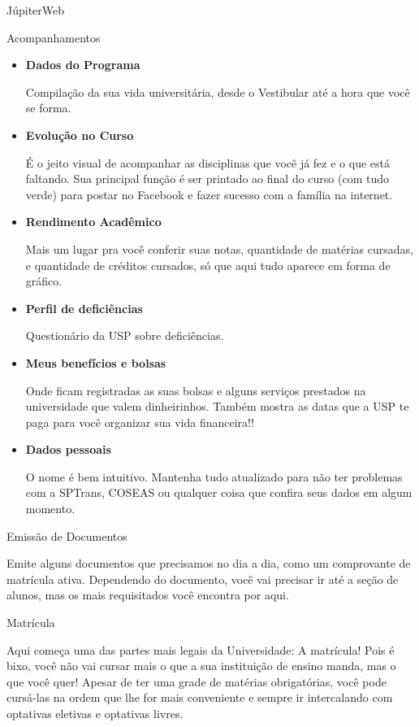 \begin{secao}{JúpiterWeb}
\begin{subsecao}{Acompanhamentos}
\begin{itemize}
  \item \textbf{Dados do Programa}

    Compilação da sua vida universitária, desde o Vestibular até a hora que
    você se forma.
  \item \textbf{Evolução no Curso}

    É o jeito visual de acompanhar as disciplinas que você já fez e o que está
    faltando. Sua principal função é ser printado ao final do curso (com tudo
    verde) para postar no Facebook e fazer sucesso com a família na internet.
  \item \textbf{Rendimento Acadêmico}

    Mais um lugar pra você conferir suas notas, quantidade de matérias
    cursadas, e quantidade de créditos cursados, só que aqui tudo aparece em
    forma de gráfico.
  \item \textbf{Perfil de deficiências}

    Questionário da USP sobre deficiências.

  \item \textbf{Meus benefícios e bolsas}

    Onde ficam registradas as suas bolsas e alguns serviços prestados na
    universidade que valem dinheirinhos. Também mostra as datas que a USP te
    paga para você organizar sua vida financeira!!

  \item \textbf{Dados pessoais}

    O nome é bem intuitivo. Mantenha tudo atualizado para não ter problemas com
    a SPTrans, COSEAS ou qualquer coisa que confira seus dados em algum momento.

\end{itemize}

\end{subsecao}

\begin{subsecao}{Emissão de Documentos}

Emite alguns documentos que precisamos no dia a dia, como um comprovante de
matrícula ativa. Dependendo do documento, você vai precisar ir até a seção de
alunos, mas os mais requisitados você encontra por aqui.

\end{subsecao}

\begin{subsecao}{Matrícula}

Aqui começa uma das partes mais legais da Universidade: A matrícula! Pois é
bixo, você não vai cursar mais o que a sua instituição de ensino manda, mas o
que você quer! Apesar de ter uma grade de matérias obrigatórias, você pode
cursá-las na ordem que lhe for mais conveniente e sempre ir intercalando com
optativas eletivas e optativas livres.


\end{subsecao}
\end{secao}
